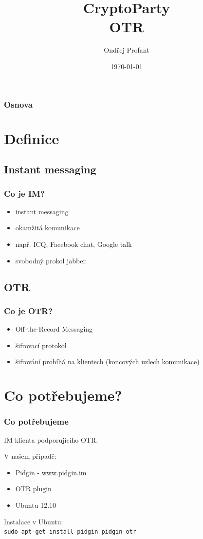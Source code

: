 \documentclass[xetex]{beamer}
\title{CryptoParty\\OTR}
\author{Ondřej Profant}
\institute[Piráti]{Česká pirátská strana}
\date{\today}
\begin{document}
\begin{frame}
  \titlepage
\end{frame}

\begin{frame}
  \frametitle{Osnova}
  \tableofcontents
\end{frame}	

\section{Definice}

\subsection{Instant messaging}
\begin{frame}
 \frametitle{Co je IM?}
 \begin{itemize} 
   \item instant messaging
   \item okamžitá komunikace
   \item např. ICQ, Facebook chat, Google talk 
	 \item svobodný prokol jabber
 \end{itemize}
\end{frame}

\subsection{OTR}
\begin{frame}
 \frametitle{Co je OTR?}
 \begin{itemize} 
   \item Off-the-Record Messaging
   \item šifrovací protokol
   \item šifrování probíhá na klientech (koncových uzlech komunikace)
 \end{itemize} 
\end{frame}

\section{Co potřebujeme?}

\begin{frame}
	\frametitle{Co potřebujeme} 

 IM klienta podporujícího OTR.

V našem případě:
	\begin{itemize}
		\item Pidgin - \url{www.pidgin.im}
		\item OTR plugin
		\item Ubuntu 12.10
	\end{itemize}

	Instalace v Ubuntu:\\
	\texttt{sudo apt-get install pidgin pidgin-otr}
\end{frame}
\end{document}
